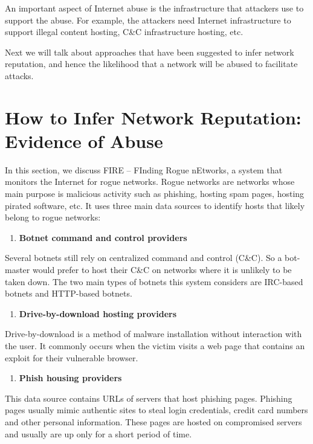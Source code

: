 \documentclass[11pt]{article}
\begin{document}
An important aspect of Internet abuse is the infrastructure that attackers use to support the abuse. For example, the attackers need Internet infrastructure to support illegal content hosting, C\&C infrastructure hosting, etc. 

Next we will talk about approaches that have been suggested to infer network reputation, and hence the likelihood that a network will be abused to facilitate attacks.


\section{How to Infer Network Reputation: Evidence of Abuse}
\label{sec:orgb9eafce}

In this section, we discuss FIRE – FInding Rogue nEtworks, a system that monitors the Internet for rogue networks. Rogue networks are networks whose main purpose is malicious activity such as phishing, hosting spam pages, hosting pirated software, etc. It uses three main data sources to identify hosts that likely belong to rogue networks:

\begin{enumerate}
\item \textbf{Botnet command and control providers}
\end{enumerate}

Several botnets still rely on centralized command and control (C\&C). So a bot-master would prefer to host their C\&C on networks where it is unlikely to be taken down. The two main types of botnets this system considers are IRC-based botnets and HTTP-based botnets.

\begin{enumerate}
\item \textbf{Drive-by-download hosting providers}
\end{enumerate}

Drive-by-download is a method of malware installation without interaction with the user. It commonly occurs when the victim visits a web page that contains an exploit for their vulnerable browser. 

\begin{enumerate}
\item \textbf{Phish housing providers}
\end{enumerate}

This data source contains URLs of servers that host phishing pages. Phishing pages usually mimic authentic sites to steal login credentials, credit card numbers and other personal information. These pages are hosted on compromised servers and usually are up only for a short period of time. 
\end{document}
